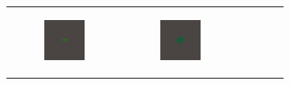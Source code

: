\documentclass[conference]{IEEEtran}
\newlength{\subfigwidth}
\begin{document}
\begin{figure}
\begin{subfigure}[b]{\textwidth}
\begin{tabular}{r M{\subfigwidth} M{\subfigwidth} M{\subfigwidth} M{\subfigwidth} M{\subfigwidth} }
\begin{subfigure}[b]{\subfigwidth}
                \includegraphics[width=\textwidth]{figures/growth_comparison_lambda_1e-3/hard.0038.png}
            \end{subfigure} &
            \begin{subfigure}[b]{\subfigwidth}
                \includegraphics[width=\textwidth]{figures/growth_comparison_lambda_1e-3/hard.0057.png}

\end{subfigure}
\end{tabular}
\end{subfigure}
\end{figure}
\end{document}

